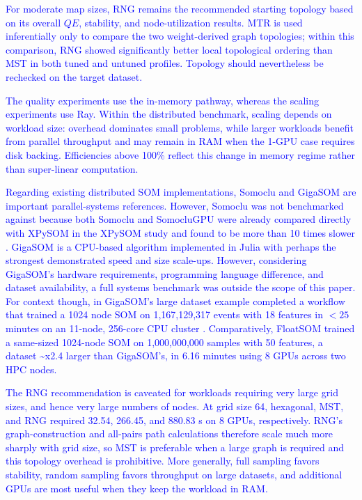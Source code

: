 \documentclass[10pt]{article} %
\newcommand{\TrackedChange}[1]{\textcolor{blue}{#1}}
\begin{document}
\TrackedChange{For moderate map sizes, RNG remains the recommended starting topology based on its overall $QE$, stability, and node-utilization results.} \TrackedChange{MTR is used inferentially only to compare the two weight-derived graph topologies; within this comparison, RNG showed significantly better local topological ordering than MST in both tuned and untuned profiles.} \TrackedChange{Topology should nevertheless be rechecked on the target dataset.}

\TrackedChange{The quality experiments use the in-memory pathway, whereas the scaling experiments use Ray.} \TrackedChange{Within the distributed benchmark, scaling depends on workload size: overhead dominates small problems, while larger workloads benefit from parallel throughput and may remain in RAM when the 1-GPU case requires disk backing.} \TrackedChange{Efficiencies above 100\% reflect this change in memory regime rather than super-linear computation.}

\TrackedChange{Regarding existing distributed SOM implementations, Somoclu and GigaSOM are important parallel-systems references.} \TrackedChange{However, Somoclu was not benchmarked against because both Somoclu and SomocluGPU were already compared directly with XPySOM in the XPySOM study and found to be more than 10 times slower \citep{manciniXPySomHighPerformanceSelfOrganizing2020}.} \TrackedChange{GigaSOM is a CPU-based algorithm implemented in Julia with perhaps the strongest demonstrated speed and size scale-ups.} \TrackedChange{However, considering GigaSOM's hardware requirements, programming language difference, and dataset availability, a full systems benchmark was outside the scope of this paper.} \TrackedChange{For context though, in GigaSOM's large dataset example completed a workflow that trained a 1024 node SOM on 1,167,129,317 events with 18 features in $<25$ minutes on an 11-node, 256-core CPU cluster \citep{kratochvilGigaSOMjlHighperformanceClustering2020}.} \TrackedChange{Comparatively, FloatSOM trained a same-sized 1024-node SOM on 1,000,000,000 samples with 50 features, a dataset \textasciitilde{}x2.4 larger than GigaSOM's, in 6.16 minutes using 8 GPUs across two HPC nodes.}

\TrackedChange{The RNG recommendation is caveated for workloads requiring very large grid sizes, and hence very large numbers of nodes.} \TrackedChange{At grid size 64, hexagonal, MST, and RNG required 32.54, 266.45, and 880.83 s on 8 GPUs, respectively.} \TrackedChange{RNG's graph-construction and all-pairs path calculations therefore scale much more sharply with grid size, so MST is preferable when a large graph is required and this topology overhead is prohibitive.} \TrackedChange{More generally, full sampling favors stability, random sampling favors throughput on large datasets, and additional GPUs are most useful when they keep the workload in RAM.}
\end{document}
